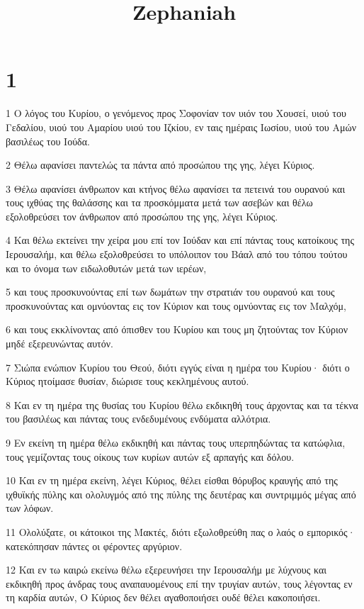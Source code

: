 

\title{Zephaniah}


\chapter{1}

\par 1 Ο λόγος του Κυρίου, ο γενόμενος προς Σοφονίαν τον υιόν του Χουσεί, υιού του Γεδαλίου, υιού του Αμαρίου υιού του Ιζκίου, εν ταις ημέραις Ιωσίου, υιού του Αμών βασιλέως του Ιούδα.
\par 2 Θέλω αφανίσει παντελώς τα πάντα από προσώπου της γης, λέγει Κύριος.
\par 3 Θέλω αφανίσει άνθρωπον και κτήνος θέλω αφανίσει τα πετεινά του ουρανού και τους ιχθύας της θαλάσσης και τα προσκόμματα μετά των ασεβών και θέλω εξολοθρεύσει τον άνθρωπον από προσώπου της γης, λέγει Κύριος.
\par 4 Και θέλω εκτείνει την χείρα μου επί τον Ιούδαν και επί πάντας τους κατοίκους της Ιερουσαλήμ, και θέλω εξολοθρεύσει το υπόλοιπον του Βάαλ από του τόπου τούτου και το όνομα των ειδωλοθυτών μετά των ιερέων,
\par 5 και τους προσκυνούντας επί των δωμάτων την στρατιάν του ουρανού και τους προσκυνούντας και ομνύοντας εις τον Κύριον και τους ομνύοντας εις τον Μαλχόμ,
\par 6 και τους εκκλίνοντας από όπισθεν του Κυρίου και τους μη ζητούντας τον Κύριον μηδέ εξερευνώντας αυτόν.
\par 7 Σιώπα ενώπιον Κυρίου του Θεού, διότι εγγύς είναι η ημέρα του Κυρίου· διότι ο Κύριος ητοίμασε θυσίαν, διώρισε τους κεκλημένους αυτού.
\par 8 Και εν τη ημέρα της θυσίας του Κυρίου θέλω εκδικηθή τους άρχοντας και τα τέκνα του βασιλέως και πάντας τους ενδεδυμένους ενδύματα αλλότρια.
\par 9 Εν εκείνη τη ημέρα θέλω εκδικηθή και πάντας τους υπερπηδώντας τα κατώφλια, τους γεμίζοντας τους οίκους των κυρίων αυτών εξ αρπαγής και δόλου.
\par 10 Και εν τη ημέρα εκείνη, λέγει Κύριος, θέλει είσθαι θόρυβος κραυγής από της ιχθυϊκής πύλης και ολολυγμός από της πύλης της δευτέρας και συντριμμός μέγας από των λόφων.
\par 11 Ολολύξατε, οι κάτοικοι της Μακτές, διότι εξωλοθρεύθη πας ο λαός ο εμπορικός· κατεκόπησαν πάντες οι φέροντες αργύριον.
\par 12 Και εν τω καιρώ εκείνω θέλω εξερευνήσει την Ιερουσαλήμ με λύχνους και εκδικηθή προς άνδρας τους αναπαυομένους επί την τρυγίαν αυτών, τους λέγοντας εν τη καρδία αυτών, Ο Κύριος δεν θέλει αγαθοποιήσει ουδέ θέλει κακοποιήσει.

